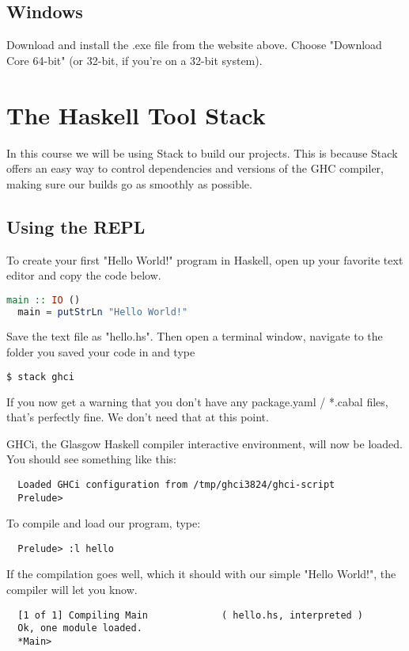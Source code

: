 \documentclass{article}
\begin{document}
\subsection{Windows}
Download and install the .exe file from the website above. Choose "Download Core 64-bit" (or 32-bit, if you're on a 32-bit system).

\section{The Haskell Tool Stack}
In this course we will be using Stack to build our projects. This is because Stack offers an easy way to control dependencies and versions of the GHC compiler, making sure our builds go as smoothly as possible.
\subsection{Using the REPL}
To create your first "Hello World!" program in Haskell, open up your favorite text editor and copy the code below.
\begin{lstlisting}[language=Haskell]
  main :: IO ()
  main = putStrLn "Hello World!"
\end{lstlisting}

Save the text file as "hello.hs". Then open a terminal window, navigate to the folder you saved your code in and type

\begin{lstlisting}[language=bash]
  $ stack ghci
\end{lstlisting}

If you now get a warning that you don't have any package.yaml / *.cabal files, that's perfectly fine. We don't need that at this point. \par
GHCi, the Glasgow Haskell compiler interactive environment, will now be loaded. You should see something like this:
\begin{lstlisting}
  Loaded GHCi configuration from /tmp/ghci3824/ghci-script
  Prelude>
\end{lstlisting}

To compile and load our program, type:
\begin{lstlisting}
  Prelude> :l hello
\end{lstlisting}

If the compilation goes well, which it should with our simple "Hello World!", the compiler will let you know.

\begin{lstlisting}
  [1 of 1] Compiling Main             ( hello.hs, interpreted )
  Ok, one module loaded.
  *Main>
\end{lstlisting}
\end{document}
